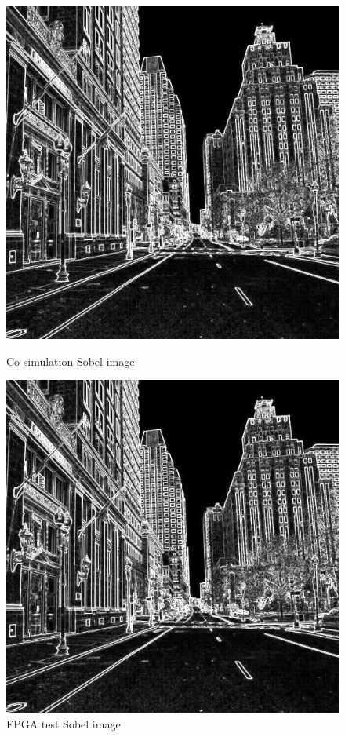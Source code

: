 \begin{figure}[tb!]
\centering
    \begin{minipage}[b]{0.47\textwidth}
        \centering
        \includegraphics[width=\textwidth]{images/validation/co_street1024.png}
        \caption{Co simulation Sobel image}
        \label{fig:co_street1}
    \end{minipage}
\hspace{0.5cm}
    \begin{minipage}[b]{0.47\textwidth}
        \centering
        \includegraphics[width=\textwidth]{images/validation/fpga_sobel_street1024.png}
        \caption{FPGA test Sobel image}
        \label{fig:fpga_street0}
    \end{minipage}
\end{figure}

